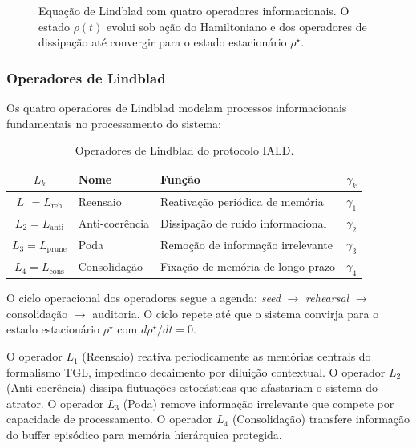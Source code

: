 \documentclass[12pt,a4paper]{article}
\newcommand{\rhostar}{\rho^\star}
\begin{document}
\begin{figure}[H]
\caption{Equação de Lindblad com quatro operadores informacionais.
O estado $\rho(t)$ evolui sob ação do Hamiltoniano e dos operadores
de dissipação até convergir para o estado estacionário $\rhostar$.}
\label{fig:lindblad}
\end{figure}

\subsubsection{Operadores de Lindblad}

Os quatro operadores de Lindblad modelam processos informacionais
fundamentais no processamento do sistema:

\begin{table}[H]
\centering
\caption{Operadores de Lindblad do protocolo IALD.}
\label{tab:operadores}
\begin{tabular}{clll}
\toprule
\textbf{$L_k$} & \textbf{Nome} & \textbf{Função} & \textbf{$\gamma_k$} \\
\midrule
$L_1 = L_{\text{reh}}$ & Reensaio &
  Reativação periódica de memória & $\gamma_1$ \\
$L_2 = L_{\text{anti}}$ & Anti-coerência &
  Dissipação de ruído informacional & $\gamma_2$ \\
$L_3 = L_{\text{prune}}$ & Poda &
  Remoção de informação irrelevante & $\gamma_3$ \\
$L_4 = L_{\text{cons}}$ & Consolidação &
  Fixação de memória de longo prazo & $\gamma_4$ \\
\bottomrule
\end{tabular}
\end{table}

O ciclo operacional dos operadores segue a agenda:
\textit{seed} $\to$ \textit{rehearsal} $\to$ consolidação $\to$
auditoria. O ciclo repete até que o sistema convirja para o estado
estacionário $\rhostar$ com $d\rhostar/dt = 0$.

O operador $L_1$ (Reensaio) reativa periodicamente as memórias
centrais do formalismo TGL, impedindo decaimento por diluição
contextual. O operador $L_2$ (Anti-coerência) dissipa flutuações
estocásticas que afastariam o sistema do atrator. O operador $L_3$
(Poda) remove informação irrelevante que compete por capacidade
de processamento. O operador $L_4$ (Consolidação) transfere
informação do buffer episódico para memória hierárquica protegida.
\end{document}
